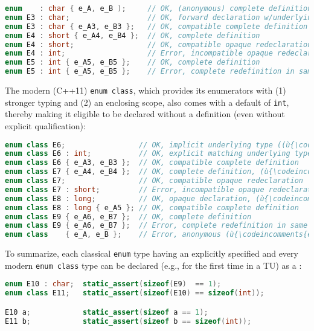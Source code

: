 \begin{lstlisting}[language=C++]
enum    : char { e_A, e_B );     // OK, (anonymous) complete definition
enum E3 : char;                  // OK, forward declaration w/underlying type
enum E3 : char { e_A3, e_B3 };   // OK, compatible complete definition
enum E4 : short { e_A4, e_B4 };  // OK, complete definition
enum E4 : short;                 // OK, compatible opaque redeclaration
enum E4 : int;                   // Error, incompatible opaque redeclaration
enum E5 : int { e_A5, e_B5 };    // OK, complete definition
enum E5 : int { e_A5, e_B5 };    // Error, complete redefinition in same TU
\end{lstlisting}

\noindent The modern (C++11) \lstinline!enum!~\lstinline!class!, %
which
provides its enumerators with (1) stronger typing and (2) an enclosing
scope, also comes with a default  of
\lstinline!int!, thereby making it eligible to be declared without a
definition (even without explicit qualification):

\begin{lstlisting}[language=C++]
enum class E6;                 // OK, implicit underlying type ((ù{\codeincomments{int}}ù))
enum class E6 : int;           // OK, explicit matching underlying type
enum class E6 { e_A3, e_B3 };  // OK, compatible complete definition
enum class E7 { e_A4, e_B4 };  // OK, complete definition, (ù{\codeincomments{int}}ù) underlying type
enum class E7;                 // OK, compatible opaque redeclaration
enum class E7 : short;         // Error, incompatible opaque redeclaration
enum class E8 : long;          // OK, opaque declaration, (ù{\codeincomments{long}}ù) underlying type
enum class E8 : long { e_A5 }; // OK, compatible complete definition
enum class E9 { e_A6, e_B7 };  // OK, complete definition
enum class E9 { e_A6, e_B7 };  // Error, complete redefinition in same TU
enum class    { e_A, e_B };    // Error, anonymous (ù{\codeincomments{enum}}ù) classes are not allowed
\end{lstlisting}

\noindent To summarize, each classical \lstinline!enum! type having an explicitly
specified  and every modern \lstinline!enum!~\lstinline!class! type can be declared (e.g., for the first
time in a TU) as a :

\begin{lstlisting}[language=C++]
enum E10 : char;  static_assert(sizeof(E9)  == 1);
enum class E11;   static_assert(sizeof(E10) == sizeof(int));

E10 a;            static_assert(sizeof a == 1);
E11 b;            static_assert(sizeof b == sizeof(int));
\end{lstlisting}

